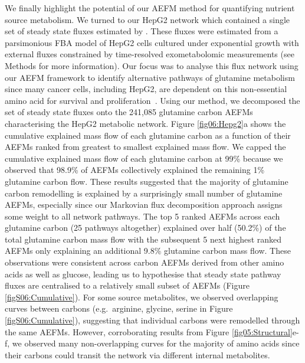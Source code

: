 \documentclass[12pt]{article}
\begin{document}
We finally highlight the potential of our AEFM method for quantifying
nutrient source metabolism. We turned to our HepG2 network which contained
a single set of steady state fluxes estimated by
\citeauthor{NilssonAvlant2020Qaoa}. These fluxes were estimated from
a parsimonious FBA model of HepG2 cells cultured under exponential growth
with external fluxes constrained by time-resolved exometabolomic
measurements (see Methods for more information). Our focus was to analyse
this flux network using our AEFM framework to identify alternative
pathways of glutamine metabolism since many cancer cells, including HepG2,
are dependent on this non-essential amino acid for survival and
proliferation~\citep{YeYanyan2023Gmri,YooHeeChan2020Gric}. Using our
method, we decomposed the set of steady state fluxes onto the 241,085
glutamine carbon AEFMs characterising the HepG2 metabolic network. Figure
\ref{fig06:Hepg2}a shows the cumulative explained mass flow of each
glutamine carbon as a function of their AEFMs ranked from greatest to
smallest explained mass flow. We capped the cumulative explained mass flow
of each glutamine carbon at 99\% because we observed that 98.9\% of AEFMs
collectively explained the remaining 1\% glutamine carbon flow. These
results suggested that the majority of glutamine carbon remodelling is
explained by a surprisingly small number of glutamine AEFMs, especially
since our Markovian flux decomposition approach assigns some weight to all
network pathways. The top 5 ranked AEFMs across each glutamine carbon (25
pathways altogether) explained over half (50.2\%) of the total glutamine
carbon mass flow with the subsequent 5 next highest ranked AEFMs only
explaining an additional 9.8\% glutamine carbon mass flow. These
observations were consistent across carbon AEFMs derived from other amino
acids as well as glucose, leading us to hypothesise that steady state
pathway fluxes are centralised to a relatively small subset of AEFMs
(Figure \ref{figS06:Cumulative}). For some source metabolites, we observed
overlapping curves between carbons (e.g.\ arginine, glycine, serine in
Figure \ref{figS06:Cumulative}), suggesting that individual carbons were
remodelled through the same AEFMs. However, corroborating results from
Figure \ref{fig05:Structural}e-f, we observed many non-overlapping curves
for the majority of amino acids since their carbons could transit the
network via different internal metabolites.

\end{document}
